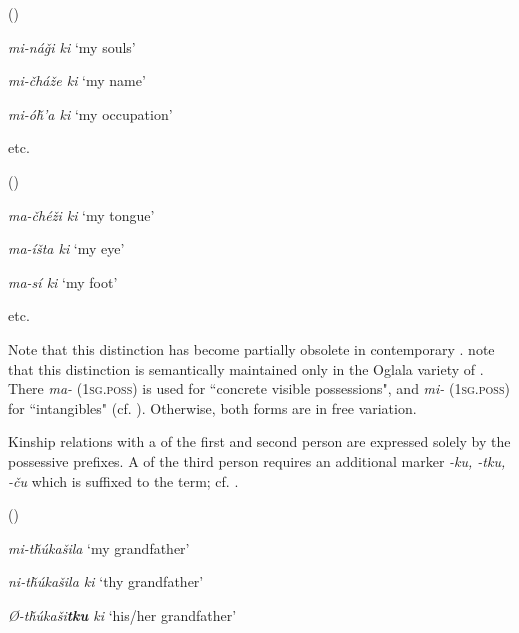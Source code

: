 \documentclass[output=paper]{LSP/langsci}
\begin{document}
\ea {} (\citealt[101]{Buechel1939}) \label{lakotaincorporeal}

\textit{mi-ná\v{g}i ki } \hspace{2.11em}		`my souls'

\textit{mi-\v{c}há\v{z}e  ki } \hspace{1.85em} `my name'

\textit{mi-ó\v{h}'a ki}	\hspace{2em}		`my occupation'

etc.

\ex {} (\citealt[100]{Buechel1939}) \label{lakotabody}

\textit{ma-\v{c}hé\v{z}i ki } \hspace{1.7em}	`my tongue'

\textit{ma-íšta ki }	 \hspace{2.11em}	`my eye'

\textit{ma-sí ki }		 \hspace{3.02em}	`my foot'

etc.
\z

Note that this distinction has become partially obsolete in contemporary . \citet[458]{RoodTaylor1996} note that this distinction is semantically maintained only in the Oglala variety of . There \textit{ma-} (\textsc{1sg.poss}) is used for ``concrete visible possessions", and \textit{mi-} (\textsc{1sg.poss}) for ``intangibles" (cf. \citealt[458]{RoodTaylor1996}). Otherwise, both forms are in free variation.

Kinship relations with a  of the first and second person are expressed solely by the possessive prefixes. A  of the third person requires an additional marker \textit{-ku, -tku, -\v{c}u} which is suffixed to the   term; cf. .
 
\ea	{} (\citealt[102]{Buechel1939}) \label{lakotamygrandfather}

\textit{mi-t\v{h}\'ukašila} \hspace{3.6em}		`my grandfather'
 
\textit{ni-t\v{h}\'ukašila ki } \hspace{2.3em}	`thy grandfather'

\textit{Ø-t\v{h}\'ukaši\textbf{tku} ki }	\hspace{1.8em} `his/her grandfather'
\z
\end{document}
